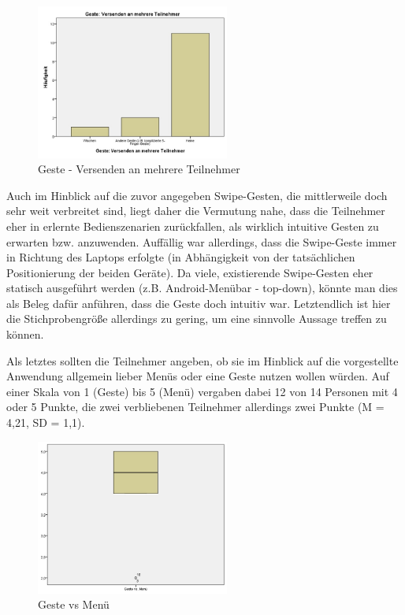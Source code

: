 \documentclass{chi-ext}
\begin{document}
\begin{figure}
  \centering
  \includegraphics[width=180pt]{img/studie/Antworten_Geste_Multicast.jpg}
  \caption{Geste - Versenden an mehrere Teilnehmer}
  \label{fig:studie_Antworten_Geste_Multicast}
\end{figure}


Auch im Hinblick auf die zuvor angegeben Swipe-Gesten, die mittlerweile doch sehr weit verbreitet sind, liegt daher die Vermutung nahe, dass die Teilnehmer eher in erlernte Bedienszenarien zurückfallen, als wirklich intuitive Gesten zu erwarten bzw. anzuwenden. Auffällig war allerdings, dass die Swipe-Geste immer in Richtung des Laptops erfolgte (in Abhängigkeit von der tatsächlichen Positionierung der beiden Geräte). Da viele, existierende Swipe-Gesten eher statisch ausgeführt werden (z.B. Android-Menübar - top-down), könnte man dies als Beleg dafür anführen, dass die Geste doch intuitiv war. Letztendlich ist hier die Stichprobengröße allerdings zu gering, um eine sinnvolle Aussage treffen zu können.

Als letztes sollten die Teilnehmer angeben, ob sie im Hinblick auf die vorgestellte Anwendung allgemein lieber Menüs oder eine Geste nutzen wollen würden. Auf einer Skala von 1 (Geste) bis 5 (Menü) vergaben dabei 12 von 14 Personen mit 4 oder 5 Punkte, die zwei verbliebenen Teilnehmer allerdings zwei Punkte (M = 4,21, SD = 1,1). 

\begin{figure}
  \centering
  \includegraphics[width=180pt]{img/studie/Geste_vs_Menu.jpg}
  \caption{Geste vs Menü}
  \label{fig:studie_Geste_vs_Menu}
\end{figure}
\end{document}
